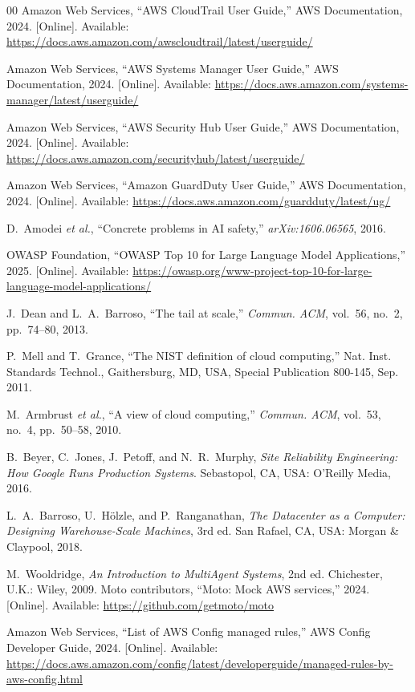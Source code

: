 \documentclass{ieeeaccess}
\begin{document}
\begin{thebibliography}{00}
Amazon Web Services, ``AWS CloudTrail User Guide,'' AWS Documentation, 2024. [Online]. Available: \url{https://docs.aws.amazon.com/awscloudtrail/latest/userguide/}

Amazon Web Services, ``AWS Systems Manager User Guide,'' AWS Documentation, 2024. [Online]. Available: \url{https://docs.aws.amazon.com/systems-manager/latest/userguide/}

Amazon Web Services, ``AWS Security Hub User Guide,'' AWS Documentation, 2024. [Online]. Available: \url{https://docs.aws.amazon.com/securityhub/latest/userguide/}

Amazon Web Services, ``Amazon GuardDuty User Guide,'' AWS Documentation, 2024. [Online]. Available: \url{https://docs.aws.amazon.com/guardduty/latest/ug/}

D.~Amodei \textit{et al.}, ``Concrete problems in AI safety,'' \textit{arXiv:1606.06565}, 2016.

OWASP Foundation, ``OWASP Top 10 for Large Language Model Applications,'' 2025. [Online]. Available: \url{https://owasp.org/www-project-top-10-for-large-language-model-applications/}

J.~Dean and L.~A.~Barroso, ``The tail at scale,'' \textit{Commun. ACM}, vol.~56, no.~2, pp.~74--80, 2013.

P.~Mell and T.~Grance, ``The NIST definition of cloud computing,'' Nat. Inst. Standards Technol., Gaithersburg, MD, USA, Special Publication 800-145, Sep. 2011.

M.~Armbrust \textit{et al.}, ``A view of cloud computing,'' \textit{Commun. ACM}, vol.~53, no.~4, pp.~50--58, 2010.

B.~Beyer, C.~Jones, J.~Petoff, and N.~R.~Murphy, \textit{Site Reliability Engineering: How Google Runs Production Systems}. Sebastopol, CA, USA: O'Reilly Media, 2016.

L.~A.~Barroso, U.~H\"olzle, and P.~Ranganathan, \textit{The Datacenter as a Computer: Designing Warehouse-Scale Machines}, 3rd ed. San Rafael, CA, USA: Morgan \& Claypool, 2018.

M.~Wooldridge, \textit{An Introduction to MultiAgent Systems}, 2nd ed. Chichester, U.K.: Wiley, 2009.
Moto contributors, ``Moto: Mock AWS services,'' 2024. [Online]. Available: \url{https://github.com/getmoto/moto}

Amazon Web Services, ``List of AWS Config managed rules,'' AWS Config Developer Guide, 2024. [Online]. Available: \url{https://docs.aws.amazon.com/config/latest/developerguide/managed-rules-by-aws-config.html}
\end{thebibliography}
\end{document}
